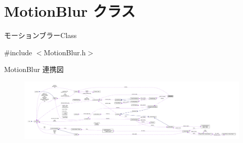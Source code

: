 \hypertarget{class_motion_blur}{}\section{Motion\+Blur クラス}
\label{class_motion_blur}


モーションブラー\+Class  




{\ttfamily \#include $<$Motion\+Blur.\+h$>$}



Motion\+Blur 連携図\nopagebreak
\begin{figure}[H]
\begin{center}
\leavevmode
\includegraphics[width=350pt]{class_motion_blur__coll__graph}
\end{center}
\end{figure}
